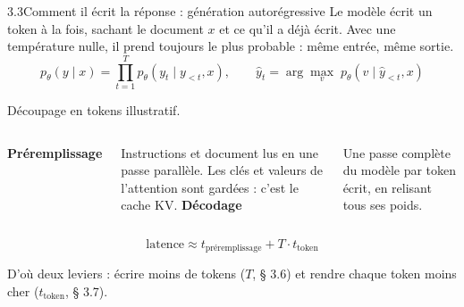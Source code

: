 \documentclass[11pt,aspectratio=169]{beamer}
\newcommand{\remarque}[1]{{\footnotesize\color{mlgray}#1\par}}
\begin{document}
\begin{frame}{3.3\quad Comment il écrit la réponse : génération autorégressive}
  \small
  Le modèle écrit un token à la fois, sachant le document $x$ et ce qu'il a déjà écrit.
  Avec une température nulle, il prend toujours le plus probable : même entrée, même sortie.
  \[
    p_\theta(y \mid x) = \prod_{t=1}^{T} p_\theta\!\left(y_t \mid y_{<t}, x\right), \qquad
    \hat y_t = \arg\max_{v}\; p_\theta\!\left(v \mid \hat y_{<t}, x\right)
  \]

  \begin{center}
    \par\remarque{Découpage en tokens illustratif.}
  \end{center}

  \begin{columns}[T]
    \textbf{Préremplissage}\par
    Instructions et document lus en une passe parallèle. Les clés et valeurs de l'attention
    sont gardées : c'est le cache KV.
    \textbf{Décodage}\par
    Une passe complète du modèle par token écrit, en relisant tous ses poids.
  \end{columns}
  \[
    \text{latence} \approx t_{\text{préremplissage}} + T \cdot t_{\text{token}}
  \]
  \remarque{D'où deux leviers : écrire moins de tokens ($T$, § 3.6) et rendre chaque token moins
  cher ($t_{\text{token}}$, § 3.7).}
\end{frame}
\end{document}

